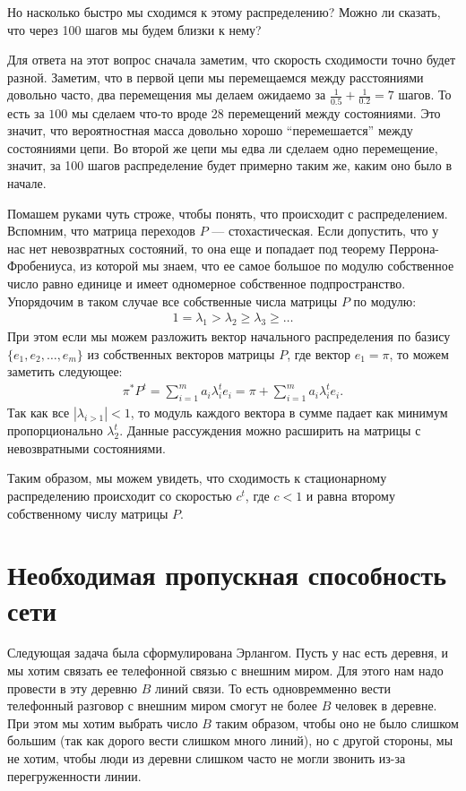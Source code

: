 \documentclass[12pt]{article}
\begin{document}
Но насколько быстро мы сходимся к этому распределению? Можно ли сказать, что через 100 шагов мы будем близки к нему?

Для ответа на этот вопрос сначала заметим, что скорость сходимости точно будет разной. Заметим, что в первой цепи мы перемещаемся между расстояниями довольно часто, два перемещения мы делаем ожидаемо за $\frac{1}{0.5} + \frac{1}{0.2} = 7$ шагов. То есть за $100$ мы сделаем что-то вроде 28 перемещений между состояниями. Это значит, что вероятностная масса довольно хорошо ``перемешается'' между состояниями цепи. Во второй же цепи мы едва ли сделаем одно перемещение, значит, за 100 шагов распределение будет примерно таким же, каким оно было в начале.

Помашем руками чуть строже, чтобы понять, что происходит с распределением. Вспомним, что матрица переходов $P$ --- стохастическая. Если допустить, что у нас нет невозвратных состояний, то она еще и попадает под теорему Перрона-Фробениуса, из которой мы знаем, что ее самое большое по модулю собственное число равно единице и имеет одномерное собственное подпространство. Упорядочим в таком случае все собственные числа матрицы $P$ по модулю: 
\begin{align*}
  1 = \lambda_1 > \lambda_2 \ge \lambda_3 \ge \dots
\end{align*}
При этом если мы можем разложить вектор начального распределения по базису $\{e_1, e_2, \dots, e_m\}$ из собственных векторов матрицы $P$, где вектор $e_1 = \pi$, то можем заметить следующее: 
\begin{align*}
  \pi^* P^t = \sum_{i = 1}^m a_i \lambda_i^t e_i = \pi + \sum_{i = 1}^m a_i \lambda_i^t e_i.
\end{align*}
Так как все $|\lambda_{i > 1}| < 1$, то модуль каждого вектора в сумме падает как минимум пропорционально $\lambda_2^t$. Данные рассуждения можно расширить на матрицы с невозвратными состояниями. 

Таким образом, мы можем увидеть, что сходимость к стационарному распределению происходит со скоростью $c^t$, где $c < 1$ и равна второму собственному числу матрицы $P$.


\section{Необходимая пропускная способность сети}
Следующая задача была сформулирована Эрлангом. Пусть у нас есть деревня, и мы хотим связать ее телефонной связью с внешним миром. Для этого нам надо провести в эту деревню $B$ линий связи. То есть одновремменно вести телефонный разговор с внешним миром смогут не более $B$ человек в деревне. При этом мы хотим выбрать число $B$ таким образом, чтобы оно не было слишком большим (так как дорого вести слишком много линий), но с другой стороны, мы не хотим, чтобы люди из деревни слишком часто не могли звонить из-за перегруженности линии.
\end{document}
